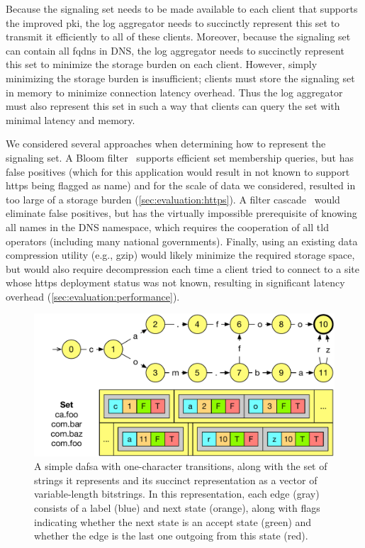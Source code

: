 Because the signaling set needs to be made available to each client that
supports the improved \ac{pki}, the log aggregator needs to succinctly represent
this set to transmit it efficiently to all of these clients. Moreover, because
the signaling set can contain all \acp{fqdn} in DNS, the log aggregator needs to
succinctly represent this set to minimize the storage burden on each client.
However, simply minimizing the storage burden is insufficient; clients must
store the signaling set in memory to minimize connection latency overhead. Thus
the log aggregator must also represent this set in such a way that clients can
query the set with minimal latency and memory.

We considered several approaches when determining how to represent the signaling
set. A Bloom filter~\cite{bloom1970space} supports efficient set membership
queries, but has false positives (which for this application would result in
 not known to support \ac{https} being flagged as  name)
and for the scale of data we considered, resulted in too large of a storage
burden (\autoref{sec:evaluation:https}). A filter
cascade~\cite{larisch2017crlite} would eliminate false positives, but has the
virtually impossible prerequisite of knowing all names in the DNS namespace,
which requires the cooperation of all \ac{tld} operators (including many
national governments). Finally, using an existing data compression utility
(e.g., gzip) would likely minimize the required storage space, but would also
require decompression each time a client tried to connect to a site whose
\ac{https} deployment status was not known, resulting in significant latency
overhead (\autoref{sec:evaluation:performance}).

\begin{figure}
  \centering
  \includegraphics[width=\linewidth]{fig/dafsa}
  \caption{A simple \ac{dafsa} with one-character transitions, along with the
    set of strings it represents and its succinct representation as a vector of
    variable-length bitstrings. In this representation, each edge (gray)
    consists of a label (blue) and next state (orange), along with flags
  indicating whether the next state is an accept state (green) and whether the
edge is the last one outgoing from this state (red).}
  \label{fig:dafsa}
\end{figure}

